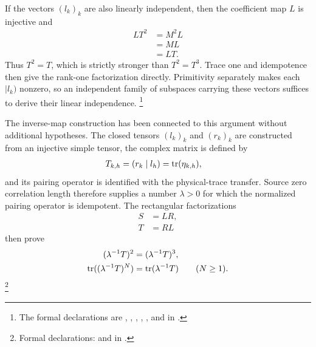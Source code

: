 \documentclass{article}
\begin{document}
If the vectors $(l_k)_k$ are also linearly independent, then the coefficient
map $L$ is injective and
\begin{align}
    LT^2
        &= M^2L
    \label{eq:cpgsv17_sector_pairing_injective_first_step}\\
        &= ML
    \label{eq:cpgsv17_sector_pairing_injective_second_step}\\
        &= LT.
    \label{eq:cpgsv17_sector_pairing_injective_cancellation}
\end{align}
Thus $T^2=T$, which is strictly stronger than $T^2=T^3$. Trace one and
idempotence then give the rank-one factorization directly. Primitivity
separately makes each $|l_k)$ nonzero, so an independent family of subspaces
carrying these vectors suffices to derive their linear independence.
\footnote{\sloppy The formal declarations are
{\scriptsize{}},
{\scriptsize{}},
{\scriptsize{}},
{\scriptsize{}},
{\scriptsize{}},
and
{\scriptsize{}}
in .}

The inverse-map construction has been connected to this argument without
additional hypotheses. The closed tensors $(l_k)_k$ and $(r_k)_k$ are
constructed from an injective simple tensor, the complex matrix is defined by
\begin{align}
    T_{k,h}
        &= (r_k\mid l_h)
         = \operatorname{tr}(\eta_{k,h}),
    \label{eq:cpgsv17_closed_sector_trace_matrix}
\end{align}
and its pairing operator is identified with the physical-trace transfer.
Source zero correlation length therefore supplies a number $\lambda>0$ for
which the normalized pairing operator is idempotent. The rectangular
factorizations
\begin{align}
    S
        &= LR,
    \label{eq:cpgsv17_inverse_map_physical_transfer}\\
    T
        &= RL
    \label{eq:cpgsv17_inverse_map_trace_matrix}
\end{align}
then prove
\begin{align}
    (\lambda^{-1}T)^2
        &= (\lambda^{-1}T)^3,
    \label{eq:cpgsv17_normalized_square_cube}\\
    \operatorname{tr}((\lambda^{-1}T)^N)
        &= \operatorname{tr}(\lambda^{-1}T)
        \qquad (N\geq 1).
    \label{eq:cpgsv17_normalized_constant_traces}
\end{align}
\footnote{\sloppy Formal declarations:
{\scriptsize{}} and
{\scriptsize{}}
in .}
\end{document}
